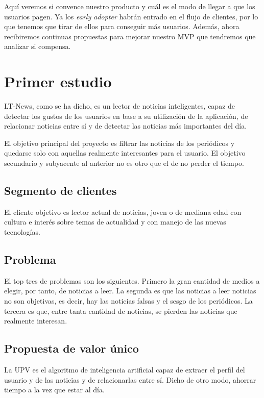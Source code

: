 Aquí veremos si convence nuestro producto y cuál es el modo de llegar a que los usuarios pagen. Ya los \textit{early adopter} habrán entrado en el flujo de clientes, por lo que tenemos que tirar de ellos para conseguir más usuarios. Además, ahora recibiremos continuas propuestas para mejorar nuestro MVP que tendremos que analizar si compensa.


\section{Primer estudio}\label{sec:primer_estudio}

LT-News, como se ha dicho, es un lector de noticias inteligentes, capaz de detectar los gustos de los usuarios en base a su utilización de la aplicación, de relacionar noticias entre sí y de detectar las noticias más importantes del día.

El objetivo principal del proyecto es filtrar las noticias de los periódicos y quedarse solo con aquellas realmente interesantes para el usuario. El objetivo secundario y subyacente al anterior no es otro que el de no perder el tiempo.


\subsection{Segmento de clientes}
El cliente objetivo es lector actual de noticias, joven o de mediana edad con cultura e interés sobre temas de actualidad y con manejo de las nuevas tecnologías. 

\subsection{Problema}
El top tres de problemas son los siguientes. Primero la gran cantidad de medios a elegir, por tanto, de noticias a leer. La segunda es que las noticias a leer noticias no son objetivas, es decir, hay las noticias falsas y el sesgo de los periódicos. La tercera es que, entre tanta cantidad de noticias, se pierden las noticias que realmente interesan.

\subsection{Propuesta de valor único}
La UPV es el algoritmo de inteligencia artificial capaz de extraer el perfil del usuario y de las noticias y de relacionarlas entre sí. Dicho de otro modo, ahorrar tiempo a la vez que estar al día.

